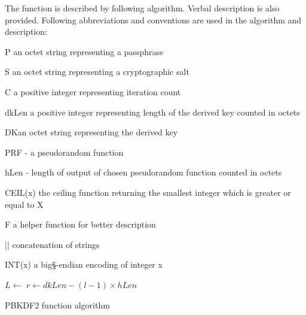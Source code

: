 \documentclass[nolof]{fithesis3}
\begin{document}
The function is described by following algorithm. Verbal description is also provided. Following abbreviations and conventions are used in the algorithm and description:

\begin{description}
\item{P} an octet string representing a passphrase

\item{S} an octet string representing a cryptographic salt

\item{C} a positive integer representing iteration count

\item{dkLen} a positive integer representing length of the derived key counted in octets

\item{DK}an octet string representing the derived key

\item{PRF} - a pseudorandom function

\item{hLen} - length of output of chosen pseudorandom function counted in octets

\item{CEIL(x)} the ceiling function returning the smallest integer which is greater or equal to X

\item{F} a helper function for better description

\item{||} concatenation of strings

\item{INT(x)} a big§-endian encoding of integer x
\end{description}


\begin{algorithm}
\DontPrintSemicolon
\LinesNumbered
{}
\(L \leftarrow \)  \;
\(r \leftarrow dkLen - (l - 1) \times hLen \)
 \;
\caption{PBKDF2 function algorithm}
\label{pbkdf2alg}
\end{algorithm}
\end{document}
